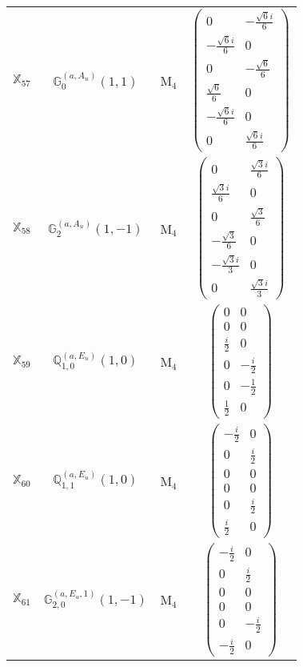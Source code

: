 \documentclass[fleqn,10pt,landscape]{article}
\begin{document}
\begin{itemize}
\begin{center}
\begin{longtable}{c|c|c|c}
$ \mathbb{X}_{57} $ & $\mathbb{G}_{0}^{(a,A_{u})}(1,1)$ & M$_{4}$ & $\begin{pmatrix} 0 & - \frac{\sqrt{6} i}{6} \\ - \frac{\sqrt{6} i}{6} & 0 \\ 0 & - \frac{\sqrt{6}}{6} \\ \frac{\sqrt{6}}{6} & 0 \\ - \frac{\sqrt{6} i}{6} & 0 \\ 0 & \frac{\sqrt{6} i}{6} \end{pmatrix}$ \\
$ \mathbb{X}_{58} $ & $\mathbb{G}_{2}^{(a,A_{u})}(1,-1)$ & M$_{4}$ & $\begin{pmatrix} 0 & \frac{\sqrt{3} i}{6} \\ \frac{\sqrt{3} i}{6} & 0 \\ 0 & \frac{\sqrt{3}}{6} \\ - \frac{\sqrt{3}}{6} & 0 \\ - \frac{\sqrt{3} i}{3} & 0 \\ 0 & \frac{\sqrt{3} i}{3} \end{pmatrix}$ \\
$ \mathbb{X}_{59} $ & $\mathbb{Q}_{1,0}^{(a,E_{u})}(1,0)$ & M$_{4}$ & $\begin{pmatrix} 0 & 0 \\ 0 & 0 \\ \frac{i}{2} & 0 \\ 0 & - \frac{i}{2} \\ 0 & - \frac{1}{2} \\ \frac{1}{2} & 0 \end{pmatrix}$ \\
$ \mathbb{X}_{60} $ & $\mathbb{Q}_{1,1}^{(a,E_{u})}(1,0)$ & M$_{4}$ & $\begin{pmatrix} - \frac{i}{2} & 0 \\ 0 & \frac{i}{2} \\ 0 & 0 \\ 0 & 0 \\ 0 & \frac{i}{2} \\ \frac{i}{2} & 0 \end{pmatrix}$ \\
$ \mathbb{X}_{61} $ & $\mathbb{G}_{2,0}^{(a,E_{u},1)}(1,-1)$ & M$_{4}$ & $\begin{pmatrix} - \frac{i}{2} & 0 \\ 0 & \frac{i}{2} \\ 0 & 0 \\ 0 & 0 \\ 0 & - \frac{i}{2} \\ - \frac{i}{2} & 0 \end{pmatrix}$ \\

\end{longtable}
\end{center}
\end{itemize}
\end{document}
